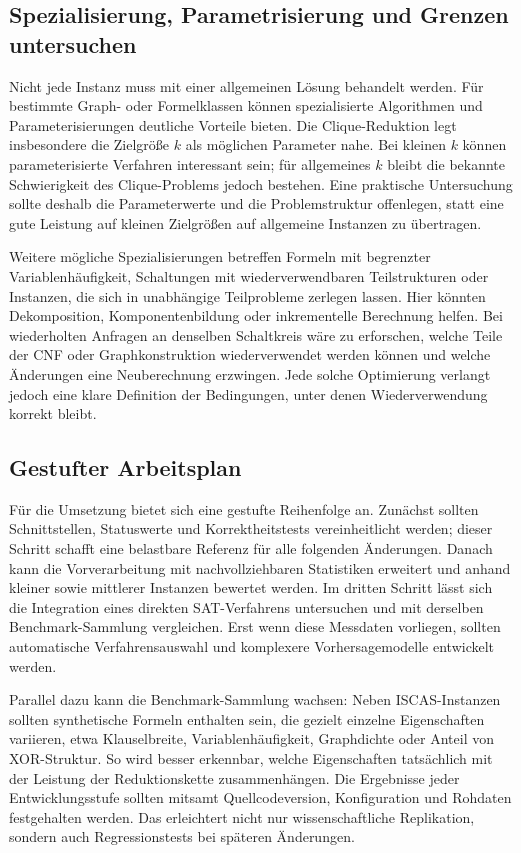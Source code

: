 \documentclass[a4paper,12pt]{article}
\theoremstyle{definition}
\begin{document}
\subsection{Spezialisierung, Parametrisierung und Grenzen untersuchen}
Nicht jede Instanz muss mit einer allgemeinen Lösung behandelt werden. Für bestimmte Graph- oder Formelklassen können spezialisierte Algorithmen und Parameterisierungen deutliche Vorteile bieten. Die Clique-Reduktion legt insbesondere die Zielgröße $k$ als möglichen Parameter nahe. Bei kleinen $k$ können parameterisierte Verfahren interessant sein; für allgemeines $k$ bleibt die bekannte Schwierigkeit des Clique-Problems jedoch bestehen. Eine praktische Untersuchung sollte deshalb die Parameterwerte und die Problemstruktur offenlegen, statt eine gute Leistung auf kleinen Zielgrößen auf allgemeine Instanzen zu übertragen.

Weitere mögliche Spezialisierungen betreffen Formeln mit begrenzter Variablenhäufigkeit, Schaltungen mit wiederverwendbaren Teilstrukturen oder Instanzen, die sich in unabhängige Teilprobleme zerlegen lassen. Hier könnten Dekomposition, Komponentenbildung oder inkrementelle Berechnung helfen. Bei wiederholten Anfragen an denselben Schaltkreis wäre zu erforschen, welche Teile der CNF oder Graphkonstruktion wiederverwendet werden können und welche Änderungen eine Neuberechnung erzwingen. Jede solche Optimierung verlangt jedoch eine klare Definition der Bedingungen, unter denen Wiederverwendung korrekt bleibt.

\subsection{Gestufter Arbeitsplan}
Für die Umsetzung bietet sich eine gestufte Reihenfolge an. Zunächst sollten Schnittstellen, Statuswerte und Korrektheitstests vereinheitlicht werden; dieser Schritt schafft eine belastbare Referenz für alle folgenden Änderungen. Danach kann die Vorverarbeitung mit nachvollziehbaren Statistiken erweitert und anhand kleiner sowie mittlerer Instanzen bewertet werden. Im dritten Schritt lässt sich die Integration eines direkten SAT-Verfahrens untersuchen und mit derselben Benchmark-Sammlung vergleichen. Erst wenn diese Messdaten vorliegen, sollten automatische Verfahrensauswahl und komplexere Vorhersagemodelle entwickelt werden.

Parallel dazu kann die Benchmark-Sammlung wachsen: Neben ISCAS-Instanzen sollten synthetische Formeln enthalten sein, die gezielt einzelne Eigenschaften variieren, etwa Klauselbreite, Variablenhäufigkeit, Graphdichte oder Anteil von XOR-Struktur. So wird besser erkennbar, welche Eigenschaften tatsächlich mit der Leistung der Reduktionskette zusammenhängen. Die Ergebnisse jeder Entwicklungsstufe sollten mitsamt Quellcodeversion, Konfiguration und Rohdaten festgehalten werden. Das erleichtert nicht nur wissenschaftliche Replikation, sondern auch Regressionstests bei späteren Änderungen.
\end{document}
